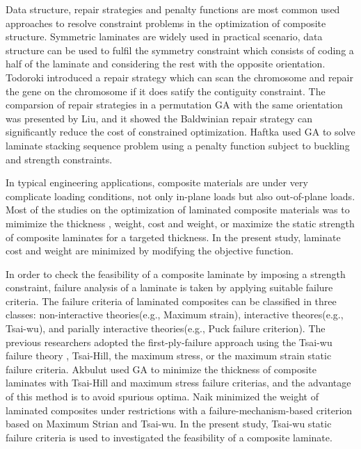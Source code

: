 \documentclass[Afour,sagev,times]{sagej}
\begin{document}
Data structure, repair strategies and penalty functions\cite{le1995improved} are most common used
approaches to resolve constraint problems in the optimization of composite structure. Symmetric
laminates are widely used in practical scenario, data structure can be used to fulfil the symmetry
constraint which consists of coding a half of the laminate and considering the rest with the
opposite orientation.  Todoroki\cite{todoroki1998stacking} introduced a repair strategy which can
scan the chromosome and repair the gene on the chromosome if it does satify the contiguity
constraint. The comparsion of repair strategies in a permutation GA with the same orientation was
presented by Liu\cite{liu2000permutation}, and it showed the Baldwinian repair strategy can
significantly reduce the cost of constrained optimization. Haftka\cite{riche1993optimization} used
GA to solve laminate stacking sequence problem using a penalty function subject to buckling and
strength constraints.


In typical engineering applications, composite materials are under very
complicate loading conditions, not only in-plane loads but also out-of-plane
loads. Most of the studies on the optimization of laminated composite materials
was to mimimize the thickness \cite{abu1998optimum,walker2003technique},
weight\cite{fang1993design,deka2005multiobjective,park2008improved}, cost and
weight\cite{deka2005multiobjective,omkar2008artificial}, or maximize the static
strength of composite laminates for a targeted
thickness\cite{walker2003technique,lin2004stacking,kim2007development}. In the
present study, laminate cost and weight are minimized by modifying the objective function.


In order to check the feasibility of a composite laminate by imposing a
strength constraint, failure analysis of a laminate is taken by applying
suitable failure criteria. The failure criteria of laminated composites can be classified in three
classes: non-interactive theories(e.g., Maximum strain), interactive theores(e.g., Tsai-wu), and
parially interactive theories(e.g., Puck failure criterion). The previous researchers adopted the
first-ply-failure approach using the Tsai-wu failure theory
\cite{massard1984computer,reddy1987first,fang1993design,soeiro1994multilevel,pelletier2006multi,jadhav2007parametric,omkar2008artificial,choudhury2019failure},
Tsai-Hill\cite{martin1987optimum,soares1995discrete}, the maximum
stress\cite{jadhav2007parametric,omkar2008artificial}, or the maximum
strain\cite{watkins1987multicriteria} static failure criteria. Akbulut\cite{akbulut2008optimum} used
GA to minimize the thickness of composite laminates with Tsai-Hill and maximum stress failure
criterias, and the advantage of this method is to avoid spurious optima.  Naik\cite{naik2008design}
minimized the weight of laminated composites under restrictions with a failure-mechanism-based
criterion based on Maximum Strian and Tsai-wu.  In the present study, Tsai-wu static failure
criteria is used to investigated the feasibility of a composite laminate.
\end{document}

